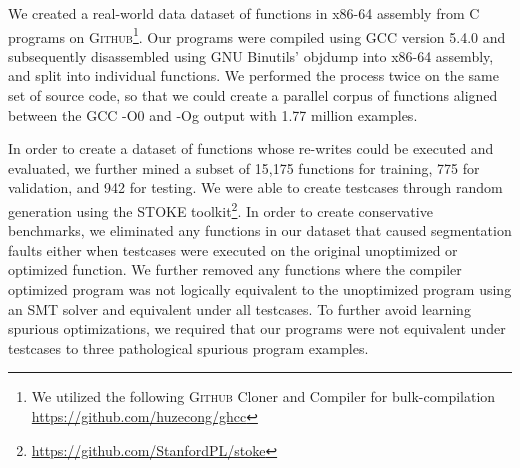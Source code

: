 \documentclass{article}
\newcommand{\GH}{\textsc{Github}}
\begin{document}




We created a real-world data dataset of functions in x86-64 assembly from C programs on \GH \footnote{We utilized the following \GH{}  Cloner and Compiler for bulk-compilation \url{https://github.com/huzecong/ghcc}}. Our programs were compiled using GCC version 5.4.0 and subsequently disassembled using \textsc{GNU} Binutils’ objdump into x86-64 assembly, and split into individual functions. We performed the process twice on the same set of source code, so that we could create a parallel corpus of functions aligned between the GCC -O0 and -Og output with 1.77 million examples. 

In order to create a dataset of functions whose re-writes could be executed and evaluated, we further mined a subset of 15,175 functions for training, 775 for validation, and 942 for testing. We were able to create testcases through random generation using the \textsc{STOKE} toolkit\footnote{\url{https://github.com/StanfordPL/stoke}}.  In order to create conservative benchmarks, we eliminated any functions in our dataset that caused segmentation faults either when testcases were executed on the original unoptimized or optimized function. We further removed any functions where the compiler optimized program was not logically equivalent to the unoptimized program using an SMT solver and equivalent under all testcases. To further avoid learning spurious optimizations, we required that our programs were not equivalent under testcases to three pathological spurious program examples. 
\end{document}
